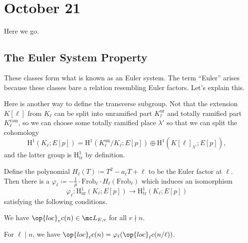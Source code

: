 \documentclass[../notes.tex]{subfiles}
\begin{document}
\section{October 21}
Here we go.

\subsection{The Euler System Property}
These classes form what is known as an Euler system. The term ``Euler'' arises because these classes bare a relation resembling Euler factors. Let's explain this.
\begin{notation}
	Here is another way to define the transverse subgroup. Not that the extension $K[\ell]$ from $K_\ell$ can be split into unramified part $K_\ell^{\mathrm{ur}}$ and totally ramified part $K_\ell^{\mathrm{ram}}$, so we can choose some totally ramified place $\lambda'$ so that we can split the cohomology
	\[\mathrm H^1(K_\ell;E[p])=\mathrm H^1(K_\ell^{\mathrm{un}}/K_\ell;E[p])\oplus\mathrm H^1(K[\ell]_{\lambda'};E[p]),\]
	and the latter group is $\mathrm H^1_{\mathrm{tr}}$ by definition.
\end{notation}
\begin{theorem} \label{thm:kolyvagin-system-prop}
	Define the polynomial $H_\ell(T)\coloneqq T^2-a_\ell T+\ell$ to be the Euler factor at $\ell$. Then there is a $\varphi_\ell\coloneqq-\frac1p\cdot\mathrm{Frob}_\ell\cdot H_\ell(\mathrm{Frob}_\ell)$ which induces an isomorphism
	\[\varphi_\ell\colon\mathrm H^1_{\mathrm{ur}}(K_\ell;E[p])\to\mathrm H^1_{\mathrm{tr}}(K_\ell;E[p])\]
	satisfying the following conditions.
	\begin{listalph}
		\item We have $\op{loc}_vc(n)\in\mc L_{E,v}$ for all $v\nmid n$.
		\item For $\ell\mid n$, we have $\op{loc}_\ell c(n)=\varphi_\ell(\op{loc}_\ell c(n/\ell))$.
	\end{listalph}
\end{theorem}
\end{document}
